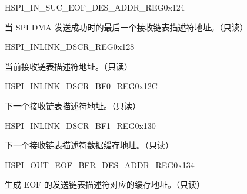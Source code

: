\begin{register}{H}{SPI\_IN\_SUC\_EOF\_DES\_ADDR\_REG}{0x124}\label{regdesc:SPIINSUCEOFDESADDRREG}
%
\regnewline%
\begin{regdesc}\begin{reglist}
\item [SPI\_IN\_SUC\_EOF\_DES\_ADDR\_REG]当 SPI DMA 发送成功时的最后一个接收链表描述符地址。（只读）
\end{reglist}\end{regdesc}
\end{register}


\begin{register}{H}{SPI\_INLINK\_DSCR\_REG}{0x128}\label{regdesc:SPIINLINKDSCRREG}
%
\regnewline%
\begin{regdesc}\begin{reglist}
\item [SPI\_INLINK\_DSCR\_REG] 当前接收链表描述符地址。（只读）
\end{reglist}\end{regdesc}
\end{register}


\begin{register}{H}{SPI\_INLINK\_DSCR\_BF0\_REG}{0x12C}\label{regdesc:SPIINLINKDSCRBF0REG}
%
\regnewline%
\begin{regdesc}\begin{reglist}
\item [SPI\_INLINK\_DSCR\_BF0\_REG]下一个接收链表描述符地址。（只读）
\end{reglist}\end{regdesc}
\end{register}


\begin{register}{H}{SPI\_INLINK\_DSCR\_BF1\_REG}{0x130}\label{regdesc:SPIINLINKDSCRBF1REG}
%
\regnewline%
\begin{regdesc}\begin{reglist}
\item [SPI\_INLINK\_DSCR\_BF1\_REG]下一个接收链表描述符数据缓存地址。（只读）
\end{reglist}\end{regdesc}
\end{register}


\begin{register}{H}{SPI\_OUT\_EOF\_BFR\_DES\_ADDR\_REG}{0x134}\label{regdesc:SPIOUTEOFBFRDESADDRREG}
%
\regnewline%
\begin{regdesc}\begin{reglist}
\item [SPI\_OUT\_EOF\_BFR\_DES\_ADDR\_REG] 生成 EOF 的发送链表描述符对应的缓存地址。（只读）
\end{reglist}\end{regdesc}
\end{register}



